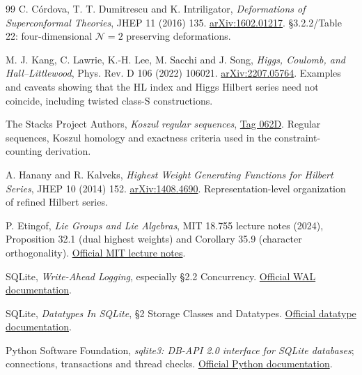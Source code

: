 \documentclass[11pt,a4paper]{article}
\numberwithin{equation}{section}
\begin{document}
\begin{thebibliography}{99}
 C. C\'ordova, T. T. Dumitrescu and K. Intriligator,
\emph{Deformations of Superconformal Theories}, JHEP 11 (2016) 135.
\href{https://arxiv.org/abs/1602.01217}{arXiv:1602.01217}.
\S3.2.2/Table 22: four-dimensional $\mathcal N=2$ preserving deformations.

 M. J. Kang, C. Lawrie, K.-H. Lee, M. Sacchi and J. Song,
\emph{Higgs, Coulomb, and Hall--Littlewood}, Phys. Rev. D 106 (2022) 106021.
\href{https://arxiv.org/abs/2207.05764}{arXiv:2207.05764}.
Examples and caveats showing that the HL index and Higgs Hilbert series need
not coincide, including twisted class-S constructions.

 The Stacks Project Authors, \emph{Koszul regular sequences},
\href{https://stacks.math.columbia.edu/tag/062D}{Tag 062D}.
Regular sequences, Koszul homology and exactness criteria used in the
constraint-counting derivation.

 A. Hanany and R. Kalveks, \emph{Highest Weight Generating
Functions for Hilbert Series}, JHEP 10 (2014) 152.
\href{https://arxiv.org/abs/1408.4690}{arXiv:1408.4690}.
Representation-level organization of refined Hilbert series.

 P. Etingof, \emph{Lie Groups and Lie Algebras}, MIT 18.755
lecture notes (2024), Proposition 32.1 (dual highest weights) and Corollary 35.9
(character orthogonality).
\href{https://ocw.mit.edu/courses/18-755-lie-groups-and-lie-algebras-ii-spring-2024/mit18_755_s24_lec_full.pdf}{Official MIT lecture notes}.

 SQLite, \emph{Write-Ahead Logging}, especially \S2.2
Concurrency. \href{https://www.sqlite.org/wal.html}{Official WAL documentation}.

 SQLite, \emph{Datatypes In SQLite}, \S2 Storage Classes
and Datatypes. \href{https://www.sqlite.org/datatype3.html}{Official datatype documentation}.

 Python Software Foundation, \emph{sqlite3: DB-API 2.0
interface for SQLite databases}; connections, transactions and thread checks.
\href{https://docs.python.org/3/library/sqlite3.html}{Official Python documentation}.

\end{thebibliography}
\end{document}
